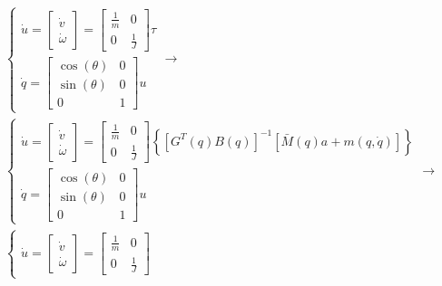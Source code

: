 \begin{gather*}
    \begin{cases}
        \dot{u} =
        \begin{bmatrix}
            \dot{v} \\
            \dot{\omega}
        \end{bmatrix}
        =
        \begin{bmatrix}
            \frac{1}{m} & 0 \\
            0 & \frac{1}{J}
        \end{bmatrix}
        \tau \\
        \dot{q} = 
        \begin{bmatrix}
            \cos(\theta) & 0\\
            \sin(\theta) & 0\\
            0 & 1
        \end{bmatrix}u
    \end{cases} \rightarrow \\
    \begin{cases}
        \dot{u} =
        \begin{bmatrix}
            \dot{v} \\
            \dot{\omega}
        \end{bmatrix}
        =
        \begin{bmatrix}
            \frac{1}{m} & 0 \\
            0 & \frac{1}{J}
        \end{bmatrix}
        \left\{\left[G^{T}(q)B(q)\right]^{-1}\left[\bar{M}(q)a+m(q,\dot{q})\right]\right\} \\
        \dot{q} = 
        \begin{bmatrix}
            \cos(\theta) & 0\\
            \sin(\theta) & 0\\
            0 & 1
        \end{bmatrix}u
    \end{cases}\rightarrow \\
    \begin{cases}
        \dot{u} =
        \begin{bmatrix}
            \dot{v} \\
            \dot{\omega}
        \end{bmatrix}
        =
        \begin{bmatrix}
            \frac{1}{m} & 0 \\
            0 & \frac{1}{J}
        \end{bmatrix}

\end{cases}
\end{gather*}
